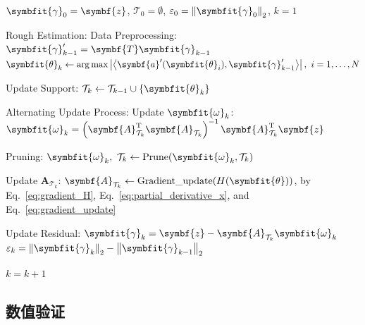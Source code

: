 \documentclass[a4paper,zihao=-4]{ctexart}
\renewcommand{\mathbf}[1]{\symbf{#1}}
\renewcommand{\boldsymbol}[1]{\symbfit{#1}}
\begin{document}
\begin{algorithm}[htbp]
    \caption{AREM Method}
    \label{alg:arem}
    \begin{algorithmic}[1]
        \Input{$\mathbf{z}$, $\mathbf{A}$, $\mathbf{A}'$, $\mathbf{T}$}
        \Init $\boldsymbol{\gamma}_0 = \mathbf{z}$, $\mathcal{T}_0 = \emptyset$, $\varepsilon_0 = \left\| \boldsymbol{\gamma}_0 \right\|_2$, $k = 1$

        \State Rough Estimation:
        \State \quad Data Preprocessing: $\boldsymbol{\gamma}_{k-1}' = \mathbf{T} \boldsymbol{\gamma}_{k-1}$
        \State \quad $\boldsymbol{\theta}_k \leftarrow \arg\max \left| \left\langle \mathbf{a}'(\boldsymbol{\theta}_i), \boldsymbol{\gamma}_{k-1}' \right\rangle \right|,\ i = 1, \dots, N$

        \State Update Support: $\mathcal{T}_k \leftarrow \mathcal{T}_{k-1} \cup \{\boldsymbol{\theta}_k\}$

        \State Alternating Update Process:
        \State Update $\boldsymbol{\omega}_k$:
        \State \quad $\boldsymbol{\omega}_k = \left( \mathbf{A}_{\mathcal{T}_k}^{\mathrm{T}} \mathbf{A}_{\mathcal{T}_k} \right)^{-1} \mathbf{A}_{\mathcal{T}_k}^{\mathrm{T}} \mathbf{z}$

        \State Pruning:
        \State \quad $\boldsymbol{\omega}_k,\ \mathcal{T}_k \leftarrow \text{Prune}(\boldsymbol{\omega}_k, \mathcal{T}_k)$

        \State Update $\mathbf{A}_{\mathcal{T}_k}$:
        \State \quad $\mathbf{A}_{\mathcal{T}_k} \leftarrow \text{Gradient\_update}(H(\boldsymbol{\theta}))$, by Eq.~\eqref{eq:gradient_H},
        \State \quad Eq.~\eqref{eq:partial_derivative_x}, and Eq.~\eqref{eq:gradient_update}

        \State Update Residual:
        \State \quad $\boldsymbol{\gamma}_k = \mathbf{z} - \mathbf{A}_{\mathcal{T}_k} \boldsymbol{\omega}_k$
        \State \quad $\varepsilon_k = \left\| \boldsymbol{\gamma}_k \right\|_2 - \left\| \boldsymbol{\gamma}_{k-1} \right\|_2$
        \EndWhile

        \State $k = k + 1$
        \EndWhile

        \Output{$\mathcal{T}_k$, $\boldsymbol{\omega}_k$}
    \end{algorithmic}
\end{algorithm}

\subsection{数值验证}
\end{document}
